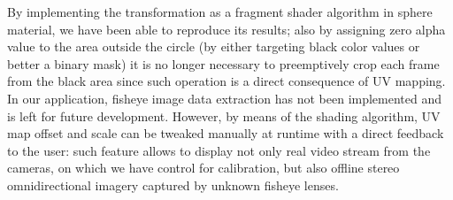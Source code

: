 By implementing the transformation as a fragment shader algorithm in sphere material, we have been able to reproduce its results; also by assigning zero alpha value to the area outside the circle (by either targeting black color values or better a binary mask) it is no longer necessary to preemptively crop each frame from the black area since such operation is a direct consequence of UV mapping.\\
In our application, fisheye image data extraction has not been implemented and is left for future development. However, by means of the shading algorithm, UV map offset and scale can be tweaked manually at runtime with a direct feedback to the user: such feature allows to display not only real video stream from the cameras, on which we have control for calibration, but also offline stereo omnidirectional imagery captured by unknown fisheye lenses.

